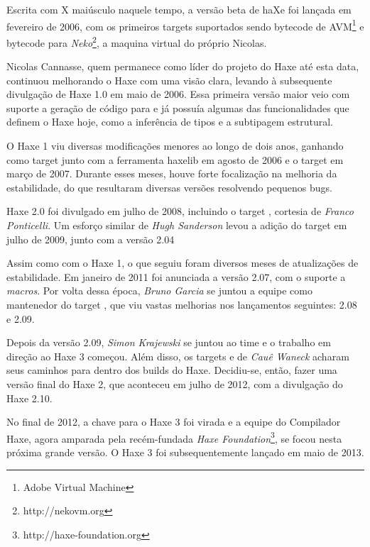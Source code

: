 Escrita com X maiúsculo naquele tempo, a versão beta de haXe foi lançada em fevereiro de 2006, com os primeiros targets suportados sendo bytecode de AVM\footnote{Adobe Virtual Machine} e bytecode para \emph{Neko}\footnote{http://nekovm.org}, a maquina virtual do próprio Nicolas.

Nicolas Cannasse, quem permanece como líder do projeto do Haxe até esta data, continuou melhorando o Haxe com uma visão clara, levando à subsequente divulgação de Haxe 1.0 em maio de 2006. Essa primeira versão maior veio com suporte a geração de código para  e já possuía algumas das funcionalidades que definem o Haxe hoje, como a inferência de tipos e a subtipagem estrutural.

O Haxe 1 viu diversas modificações menores ao longo de dois anos, ganhando  como target junto com a ferramenta {haxelib} em agosto de 2006 e o target em março de 2007. Durante esses meses, houve forte focalização na melhoria da estabilidade, do que resultaram diversas versões resolvendo pequenos bugs.

Haxe 2.0 foi divulgado em julho de 2008, incluindo o target , cortesia de \emph{Franco Ponticelli}. Um esforço similar de \emph{Hugh Sanderson} levou a adição do target  em julho de 2009, junto com a versão 2.04

Assim como com o Haxe 1, o que seguiu foram diversos meses de atualizações de estabilidade. Em janeiro de 2011 foi anunciada a versão 2.07, com o suporte a \emph{macros}. Por volta dessa época, \emph{Bruno Garcia} se juntou a equipe como mantenedor do target , que viu vastas melhorias nos lançamentos seguintes: 2.08 e 2.09.

Depois da versão 2.09, \emph{Simon Krajewski} se juntou ao time e o trabalho em direção ao Haxe 3 começou. Além disso, os targets  e  de \emph{Cauê Waneck} acharam seus caminhos para dentro dos builds do Haxe. Decidiu-se, então, fazer uma versão final do Haxe 2, que aconteceu em julho de 2012, com a divulgação do Haxe 2.10.

No final de 2012, a chave para o Haxe 3 foi virada e a equipe do Compilador Haxe, agora amparada pela recém-fundada \emph{Haxe Foundation}\footnote{http://haxe-foundation.org}, se focou nesta próxima grande versão. O Haxe 3 foi subsequentemente lançado em maio de 2013.

